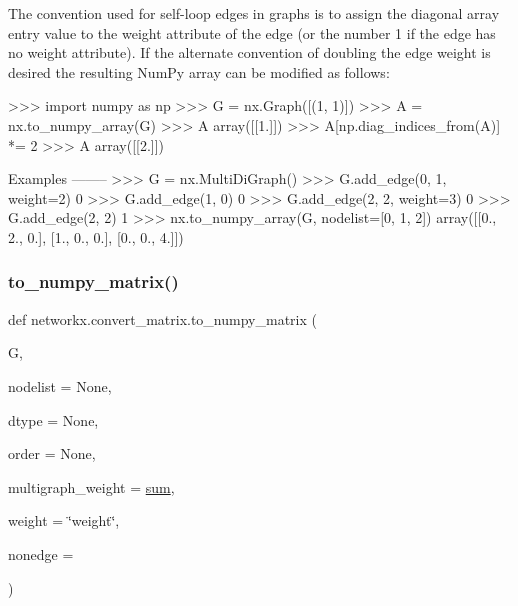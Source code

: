 \begin{DoxyVerb}
The convention used for self-loop edges in graphs is to assign the
diagonal array entry value to the weight attribute of the edge
(or the number 1 if the edge has no weight attribute). If the
alternate convention of doubling the edge weight is desired the
resulting NumPy array can be modified as follows:

>>> import numpy as np
>>> G = nx.Graph([(1, 1)])
>>> A = nx.to_numpy_array(G)
>>> A
array([[1.]])
>>> A[np.diag_indices_from(A)] *= 2
>>> A
array([[2.]])

Examples
--------
>>> G = nx.MultiDiGraph()
>>> G.add_edge(0, 1, weight=2)
0
>>> G.add_edge(1, 0)
0
>>> G.add_edge(2, 2, weight=3)
0
>>> G.add_edge(2, 2)
1
>>> nx.to_numpy_array(G, nodelist=[0, 1, 2])
array([[0., 2., 0.],
       [1., 0., 0.],
       [0., 0., 4.]])\end{DoxyVerb}
 \mbox{\label{namespacenetworkx_1_1convert__matrix_a3a9192800f2d95a6d3588aa9e4516d20}} 
\subsubsection{\texorpdfstring{to\+\_\+numpy\+\_\+matrix()}{to\_numpy\_matrix()}}
{\footnotesize\ttfamily def networkx.\+convert\+\_\+matrix.\+to\+\_\+numpy\+\_\+matrix (\begin{DoxyParamCaption}\item[{}]{G,  }\item[{}]{nodelist = {\ttfamily None},  }\item[{}]{dtype = {\ttfamily None},  }\item[{}]{order = {\ttfamily None},  }\item[{}]{multigraph\+\_\+weight = {\ttfamily \hyperlink{assumed__shape_2foo__free_8f90_a1c860bb40bf43c289bc16f8634733f9a}{sum}},  }\item[{}]{weight = {\ttfamily \char`\"{}weight\char`\"{}},  }\item[{}]{nonedge = {} }\end{DoxyParamCaption})}

